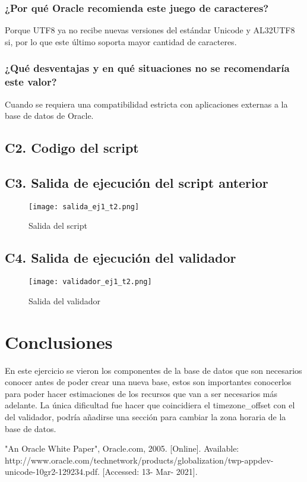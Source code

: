 \documentclass[journal]{IEEEtran}
\begin{document}
\subsubsection{¿Por qué Oracle recomienda este juego de caracteres?}
Porque UTF8 ya no recibe nuevas versiones del estándar Unicode y AL32UTF8 si, por lo que este último
soporta mayor cantidad de caracteres.
\subsubsection{¿Qué desventajas y en qué situaciones no se recomendaría este valor?}
Cuando se requiera una compatibilidad estricta con aplicaciones externas a la base de datos de Oracle.
\subsection{C2. Codigo del script}

\subsection{C3. Salida de ejecución del script anterior}
\begin{figure}[H]
  \centering
  \texttt{[image: salida\_ej1\_t2.png]}
   \caption{Salida del script}
   \label{fig:salidascript}
\end{figure}
\subsection{C4. Salida de ejecución del validador}
\begin{figure}[H]
  \centering
  \texttt{[image: validador\_ej1\_t2.png]}
   \caption{Salida del validador}
   \label{fig:validador}
\end{figure}
\section{Conclusiones}
En este ejercicio se vieron los componentes de la base de datos que 
son necesarios conocer antes de poder crear una nueva base, estos
son importantes conocerlos para poder hacer estimaciones de los 
recursos que van a ser necesarios más adelante. La única dificultad
fue hacer que coincidiera el timezone\_offset con el del validador,
podría añadirse una sección para cambiar la zona horaria de la base de datos.
\ifCLASSOPTIONcaptionsoff
  \newpage

\fi

\begin{thebibliography}{2}
  "An Oracle White Paper", 
  Oracle.com, 2005. [Online]. 
  Available: http://www.oracle.com/technetwork/products/globalization/twp-appdev-unicode-10gr2-129234.pdf. 
  [Accessed: 13- Mar- 2021].
\end{thebibliography}
\end{document}
